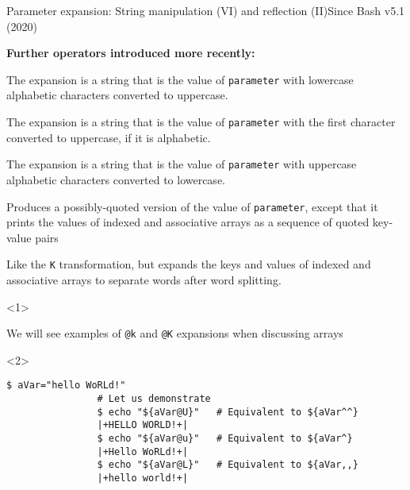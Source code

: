 \begin{frame}[fragile]{Parameter expansion: String manipulation (VI) and reflection (II)}{Since Bash v5.1 (2020)}
    \begin{overlayarea}{\textwidth}{0.5\textheight}
        \textbf{Further operators introduced more recently:}
        \begin{description}[X:]
            \item[U]
            {\small
                The expansion is a string that is the value of \texttt{parameter} with lowercase alphabetic characters converted to uppercase.
            }
            \item[u]
            {\small
                The expansion is a string that is the value of \texttt{parameter} with the first character converted to uppercase, if it is alphabetic.
            }
            \item[L]
            {\small
                The expansion is a string that is the value of \texttt{parameter} with uppercase alphabetic characters converted to lowercase.
            }
            \item<only@1>[K]
            {\small
                Produces a possibly-quoted version of the value of \texttt{parameter}, except that it prints the values of indexed and associative arrays as a sequence of quoted key-value pairs
            }
            \item<only@1>[k]
            {\small
                Like the \texttt{K} transformation, but expands the keys and values of indexed and associative arrays to separate words after word splitting. 
            }
        \end{description}
        \begin{onlyenv}<1>
            \begin{center}
                \alert{We will see examples of \texttt{@k} and \texttt{@K} expansions when discussing arrays}
            \end{center}
        \end{onlyenv}
        \begin{onlyenv}<2>
            \begin{lstlisting}[style=MyBash, style=oddnumbers, aboveskip=3mm]
                $ aVar="hello WoRLd!"
                # Let us demonstrate
                $ echo "${aVar@U}"   # Equivalent to ${aVar^^}
                |+HELLO WORLD!+|
                $ echo "${aVar@u}"   # Equivalent to ${aVar^}
                |+Hello WoRLd!+|
                $ echo "${aVar@L}"   # Equivalent to ${aVar,,}
                |+hello world!+|
            \end{lstlisting}
        \end{onlyenv}
    \end{overlayarea}
\end{frame}
